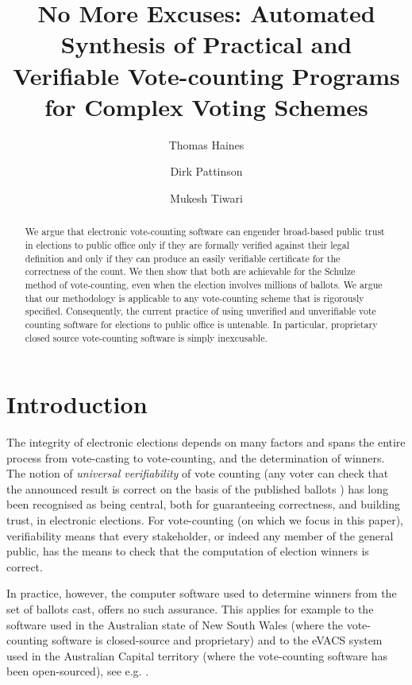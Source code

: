 \documentclass{llncs}
\begin{document}
\title{No More Excuses: Automated Synthesis of Practical and
Verifiable Vote-counting Programs for Complex Voting Schemes}

\author{Thomas Haines  \and
      Dirk Pattinson \and Mukesh Tiwari }
\maketitle

\begin{abstract}
We argue that electronic vote-counting software can engender
broad-based public trust in elections to public office only if they
are
formally verified against their legal definition and only if they
can
produce an easily verifiable certificate for the correctness of the
count. We then show that both are achievable for the Schulze method of
vote-counting, even when the election involves millions of ballots. We
argue that our methodology is applicable to any vote-counting scheme
that is rigorously specified. Consequently, the current practice of
using unverified and unverifiable vote counting software for elections
to public office is untenable. In particular, proprietary closed
source vote-counting software is simply inexcusable.
\end{abstract}


\section{Introduction}


The integrity of electronic elections depends on many factors and
spans the entire process from vote-casting to vote-counting, and the
determination of winners. The notion of \emph{universal
verifiability} of vote counting (any voter can check that the
announced result is correct on the basis of the published ballots
\cite{Kremer:2010:EVE}) has long been recognised as being
central, 
both for guaranteeing  correctness, and building trust,
in electronic elections. For vote-counting (on which we focus in
this paper), verifiability means that every stakeholder, or indeed any
member of the general public, has the means to check that the computation
of election winners is correct. 

In practice, however, the computer software used to determine
winners from the set of ballots cast, offers no such assurance. This
applies for example to the software used in the Australian state of
New South Wales (where the vote-counting software is closed-source
and proprietary) and to the eVACS system used in the Australian
Capital territory (where the vote-counting software has been
open-sourced), see e.g. \cite{AEC:2013:LMM,Conway:2017:ANS,EA:2016:EVC}.
\end{document}
